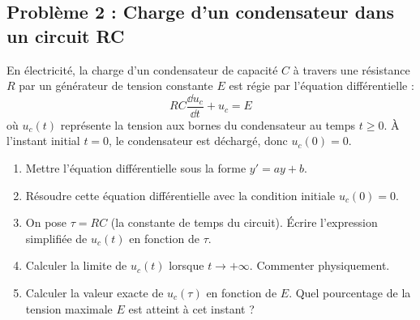 \subsection*{Problème 2 : Charge d'un condensateur dans un circuit RC}
En électricité, la charge d'un condensateur de capacité $C$ à travers une résistance $R$ par un générateur de tension constante $E$ est régie par l'équation différentielle :
\[
R C \frac{\dd u_c}{\dd t} + u_c = E
\]
où $u_c(t)$ représente la tension aux bornes du condensateur au temps $t \ge 0$.
À l'instant initial $t=0$, le condensateur est déchargé, donc $u_c(0) = 0$.
\begin{enumerate}
    \item Mettre l'équation différentielle sous la forme $y' = ay + b$.
    \item Résoudre cette équation différentielle avec la condition initiale $u_c(0) = 0$.
    \item On pose $\tau = R C$ (la constante de temps du circuit). Écrire l'expression simplifiée de $u_c(t)$ en fonction de $\tau$.
    \item Calculer la limite de $u_c(t)$ lorsque $t \to +\infty$. Commenter physiquement.
    \item Calculer la valeur exacte de $u_c(\tau)$ en fonction de $E$. Quel pourcentage de la tension maximale $E$ est atteint à cet instant ?
\end{enumerate}

